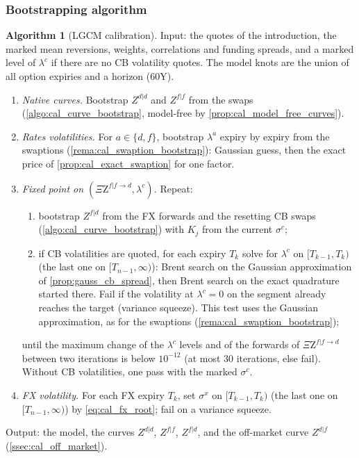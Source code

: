 \documentclass[11pt,english]{amsart}
\newcommand{\QZ}{{\Xi\mathrm{Z}}}
\theoremstyle{definition}
\newtheorem{algo}{Algorithm}
\begin{document}
\subsubsection{Bootstrapping algorithm}%

\begin{algo}[LGCM calibration]\label{algo:cal_lgcm}
Input: the quotes of the introduction, the marked mean reversions, weights, correlations and funding spreads, and a marked level of $\lambda^c$ if there are no CB volatility quotes. The model knots are the union of all option expiries and a horizon ($60$Y).
\begin{enumerate}
\item \emph{Native curves.} Bootstrap $Z^{d|d}$ and $Z^{f|f}$ from the swaps (\autoref{algo:cal_curve_bootstrap}, model-free by \autoref{prop:cal_model_free_curves}).
\item \emph{Rates volatilities.} For $a\in\{d,f\}$, bootstrap $\lambda^a$ expiry by expiry from the swaptions (\autoref{rema:cal_swaption_bootstrap}): Gaussian guess, then the exact price of \autoref{prop:cal_exact_swaption} for one factor.
\item \emph{Fixed point on $(\QZ^{f|f\to d},\lambda^c)$.} Repeat:
\begin{enumerate}
\item bootstrap $Z^{f|d}$ from the FX forwards and the resetting CB swaps (\autoref{algo:cal_curve_bootstrap}) with $K_j$ from the current $\sigma^c$;
\item if CB volatilities are quoted, for each expiry $T_k$ solve for $\lambda^c$ on $[T_{k-1},T_k)$ (the last one on $[T_{n-1},\infty)$): Brent search on the Gaussian approximation of \autoref{prop:gauss_cb_spread}, then Brent search on the exact quadrature started there. Fail if the volatility at $\lambda^c = 0$ on the segment already reaches the target (variance squeeze). This test uses the Gaussian approximation, as for the swaptions (\autoref{rema:cal_swaption_bootstrap});
\end{enumerate}
until the maximum change of the $\lambda^c$ levels and of the forwards of $\QZ^{f|f\to d}$ between two iterations is below $10^{-12}$ (at most $30$ iterations, else fail). Without CB volatilities, one pass with the marked $\sigma^c$.
\item \emph{FX volatility.} For each FX expiry $T_k$, set $\sigma^x$ on $[T_{k-1},T_k)$ (the last one on $[T_{n-1},\infty)$) by \eqref{eq:cal_fx_root}; fail on a variance squeeze.
\end{enumerate}
Output: the model, the curves $Z^{d|d}$, $Z^{f|f}$, $Z^{f|d}$, and the off-market curve $Z^{d|f}$ (\autoref{ssec:cal_off_market}).
\end{algo}
\end{document}
